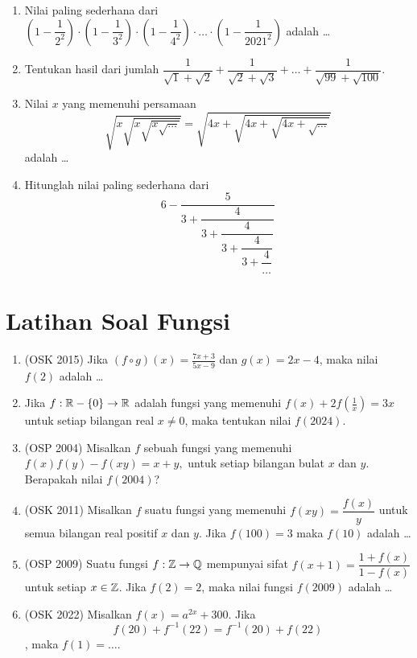 \documentclass[12pt]{scrartcl}
\begin{document}
\begin{enumerate}
\item  Nilai paling sederhana dari $\left(1-\dfrac{1}{2^2}\right)\cdot\left(1-\dfrac{1}{3^2}\right)\cdot\left(1-\dfrac{1}{4^2}\right)\cdot\dots\cdot\left(1-\dfrac{1}{2021^2}\right)$ adalah \dots

\item Tentukan hasil dari jumlah $\dfrac{1}{\sqrt{1}+\sqrt{2}}+\dfrac{1}{\sqrt{2}+\sqrt{3}}+\dots+\dfrac{1}{\sqrt{99}+\sqrt{100}}.$

\item Nilai $x$ yang memenuhi persamaan
$$\sqrt{x\sqrt{x\sqrt{x\sqrt{\dots}}}}=\sqrt{4x+\sqrt{4x+\sqrt{4x+\sqrt{\dots}}}}$$
adalah \dots

\item Hitunglah nilai paling sederhana dari
$$6-\dfrac{5}{3+\dfrac{4}{3+\dfrac{4}{3+\dfrac{4}{3+\dfrac{4}{\dots}}}}}$$
\end{enumerate}

\section{Latihan Soal Fungsi}
\begin{enumerate}
        \item (OSK 2015) Jika $(f \circ g)(x) = \frac{7x + 3}{5x - 9}$ dan $g(x) = 2x - 4$, maka nilai $f(2)$ adalah \ldots

        \item Jika $f:\mathbb R-\{0\} \rightarrow \mathbb R$ adalah fungsi yang memenuhi $f(x)+2f\left(\frac{1}{x}\right)=3x$ untuk setiap bilangan real $x \neq 0$, maka tentukan nilai $f(2024).$

        \item (OSP 2004) Misalkan $f$ sebuah fungsi yang memenuhi $f(x)f(y)-f(xy)=x+y,$ untuk setiap bilangan bulat $x$ dan $y$. Berapakah nilai $f(2004)$?
        
        \item (OSK 2011) Misalkan $f$ suatu fungsi yang memenuhi $f(xy) = \dfrac{f(x)}{y}$ untuk semua bilangan real positif $x$ dan $y$. Jika $f(100)=3$ maka $f(10)$ adalah \dots
        
        \item (OSP 2009) Suatu fungsi $f:\mathbb Z \rightarrow \mathbb Q$ mempunyai sifat $f(x+1)=\dfrac{1+f(x)}{1-f(x)}$ untuk setiap $x \in \mathbb Z$. Jika $f(2)=2$, maka nilai fungsi $f(2009)$ adalah \dots

        \item (OSK 2022) Misalkan $f(x) = a^{2x} + 300$. Jika
        $$f(20) + f^{-1}(22) = f^{-1}(20) + f(22)$$,
        maka $f(1) = \dots$.

\end{enumerate}
\end{document}
